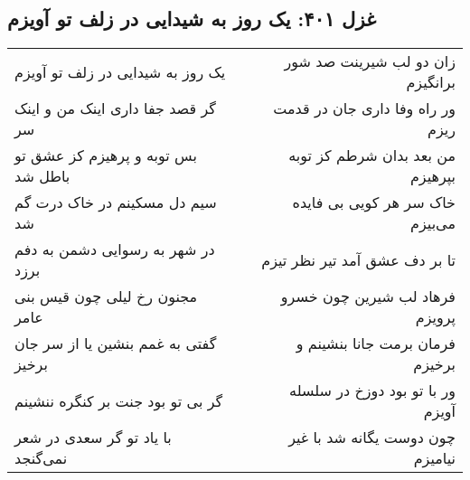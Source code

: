 \begin{center}
\section*{غزل ۴۰۱: یک روز به شیدایی در زلف تو آویزم}
\label{sec:401}
\begin{longtable}{l p{0.5cm} r}
یک روز به شیدایی در زلف تو آویزم
&&
زان دو لب شیرینت صد شور برانگیزم
\\
گر قصد جفا داری اینک من و اینک سر
&&
ور راه وفا داری جان در قدمت ریزم
\\
بس توبه و پرهیزم کز عشق تو باطل شد
&&
من بعد بدان شرطم کز توبه بپرهیزم
\\
سیم دل مسکینم در خاک درت گم شد
&&
خاک سر هر کویی بی فایده می‌بیزم
\\
در شهر به رسوایی دشمن به دفم برزد
&&
تا بر دف عشق آمد تیر نظر تیزم
\\
مجنون رخ لیلی چون قیس بنی عامر
&&
فرهاد لب شیرین چون خسرو پرویزم
\\
گفتی به غمم بنشین یا از سر جان برخیز
&&
فرمان برمت جانا بنشینم و برخیزم
\\
گر بی تو بود جنت بر کنگره ننشینم
&&
ور با تو بود دوزخ در سلسله آویزم
\\
با یاد تو گر سعدی در شعر نمی‌گنجد
&&
چون دوست یگانه شد با غیر نیامیزم
\\
\end{longtable}
\end{center}
